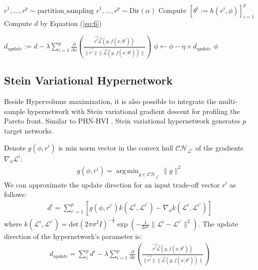 \documentclass[letterpaper]{article} %
\DeclareMathOperator*{\argmin}{arg\,min}
\newcommand{\ourmodel}{PHN-HVI }
\begin{document}
\begin{algorithm}
\caption{\ourmodel optimization algorithm}
\begin{algorithmic}[1]
\STATE $r^1, \dots, r^p \sim \text{partition\_sampling}$
\ELSE
\STATE $r^1, \dots, r^p \sim \text{Dir}(\alpha)$
\ENDIF
\STATE Compute $\left[\theta^{i} := h(r^i, \phi)\right]_{i=1}^p$ \vspace{5pt}
\STATE Compute $d$ by Equation (\ref{eq:6})

\STATE $d_{update} := d - \lambda\sum_{i=1}^p \frac{\partial}{\partial \phi}\left( \frac{\vec{r^i}\vec{\mathcal{L}}(y, f\left(x; \theta^{i} \right))}{\|\vec{r^i}\|\|\vec{\mathcal{L}}(y, f\left(x; \theta^{i} \right))\|}\right) $ 
\STATE $\phi \xleftarrow{} \phi - \eta \times d_{update} $
\ENDWHILE
\RETURN $\phi$
\end{algorithmic}
\label{alg:1}
\end{algorithm}

\subsection{Stein Variational Hypernetwork}
Beside Hypervolume maximization, it is also possible to integrate the multi-sample hypernetwork with Stein variational gradient descent \cite{moosvgd} for profiling the Pareto front. Similar to \ourmodel, Stein variational hypernetwork generates $p$ target networks. 

Denote $g(\phi, r^i)$ is min norm vector in the convex hull $\mathcal{CH}_{\mathcal{L}^i}$ of the gradients $\nabla_{\phi}\mathcal{L}^i$:
\begin{align}
    g(\phi, r^i) = \argmin_{g \in \mathcal{CH}_{\mathcal{L}^i}} \|g\|^2
\end{align}
We can approximate the update direction for an input trade-off vector $r^i$ as follows:
\begin{align}
    d^i = \sum_{i'=1}^p \left[ g(\phi, r^{i'}) k(\mathcal{L}^i, \mathcal{L}^{i'}) - \nabla_{\phi}k(\mathcal{L}^i, \mathcal{L}^{i'}) \right]
\end{align}
where $k(\mathcal{L}^i, \mathcal{L}^{i'})=\text{det}(2\pi \sigma^2I)^{-\frac{1}{2}}\exp(-\frac{1}{2\sigma^2}\|\mathcal{L}^i-\mathcal{L}^{i'}\|^2)$.
The update direction of the hypernetwork's parameter is:
\begin{align}
    d_{update} = \sum_i^p d^i - \lambda\sum_{i=1}^p \frac{\partial}{\partial \phi}\left( \frac{\vec{r^i}\vec{\mathcal{L}}(y, f\left(x; \theta^{i} \right))}{\|\vec{r^i}\|\|\vec{\mathcal{L}}(y, f\left(x; \theta^{i} \right))\|}\right) 
\end{align}
\end{document}
